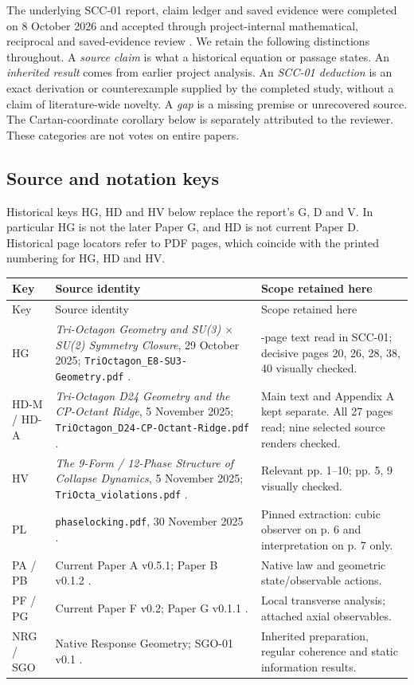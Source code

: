 \documentclass[11pt,a4paper]{article}
\numberwithin{equation}{section}
\begin{document}
The underlying SCC-01 report, claim ledger and saved evidence were completed on 8 October 2026 and accepted through project-internal mathematical, reciprocal and saved-evidence review \cite{scc,review,response,addendum}. We retain the following distinctions throughout. A \emph{source claim} is what a historical equation or passage states. An \emph{inherited result} comes from earlier project analysis. An \emph{SCC-01 deduction} is an exact derivation or counterexample supplied by the completed study, without a claim of literature-wide novelty. A \emph{gap} is a missing premise or unrecovered source. The Cartan-coordinate corollary below is separately attributed to the reviewer. These categories are not votes on entire papers.

\subsection{Source and notation keys}
Historical keys HG, HD and HV below replace the report's G, D and V. In particular HG is not the later Paper G, and HD is not current Paper D. Historical page locators refer to PDF pages, which coincide with the printed numbering for HG, HD and HV.

{\small
\begin{longtable}{@{}>{\raggedright\arraybackslash}p{.10\linewidth}>{\raggedright\arraybackslash}p{.53\linewidth}>{\raggedright\arraybackslash}p{.31\linewidth}@{}}
\toprule Key & Source identity & Scope retained here\\\midrule\endfirsthead
\toprule Key & Source identity & Scope retained here\\\midrule\endhead
HG & \emph{Tri-Octagon Geometry and SU(3) $\times$ SU(2) Symmetry Closure}, 29 October 2025; \texttt{TriOctagon\_E8-SU3-Geometry.pdf} \cite{hg}. & 41-page text read in SCC-01; decisive pages 20, 26, 28, 38, 40 visually checked.\\
HD-M / HD-A & \emph{Tri-Octagon D24 Geometry and the CP-Octant Ridge}, 5 November 2025; \texttt{TriOctagon\_D24-CP-Octant-Ridge.pdf} \cite{hd}. & Main text and Appendix A kept separate. All 27 pages read; nine selected source renders checked.\\
HV & \emph{The 9-Form / 12-Phase Structure of Collapse Dynamics}, 5 November 2025; \texttt{TriOcta\_violations.pdf} \cite{hv}. & Relevant pp. 1--10; pp. 5, 9 visually checked.\\
PL & \texttt{phaselocking.pdf}, 30 November 2025 \cite{pl}. & Pinned extraction: cubic observer on p. 6 and interpretation on p. 7 only.\\
PA / PB & Current Paper A v0.5.1; Paper B v0.1.2 \cite{pa,pb}. & Native law and geometric state/observable actions.\\
PF / PG & Current Paper F v0.2; Paper G v0.1.1 \cite{pf,pg}. & Local transverse analysis; attached axial observables.\\
NRG / SGO & Native Response Geometry; SGO-01 v0.1 \cite{nrg,sgo}. & Inherited preparation, regular coherence and static information results.\\
\bottomrule
\end{longtable}}
\end{document}

